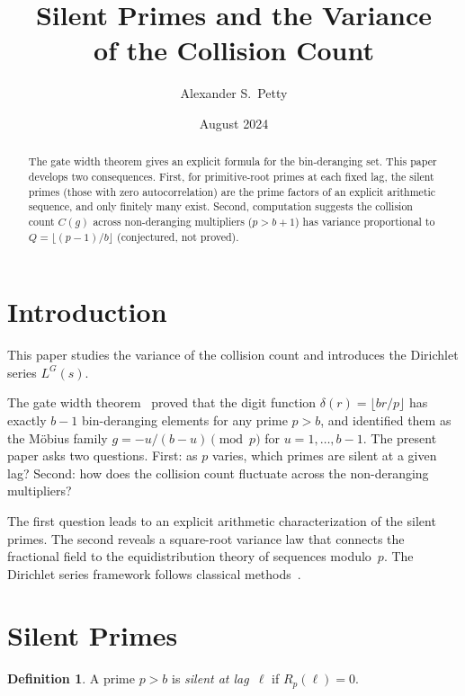 \documentclass[12pt]{amsart}
\title{Silent Primes and the Variance\\of the Collision Count}
\author{Alexander S.\ Petty}
\date{August 2024}
\theoremstyle{definition}
\newtheorem{definition}[theorem]{Definition}
\theoremstyle{remark}
\begin{document}
\begin{abstract}
The gate width theorem gives an explicit formula for the
bin-deranging set. This paper develops two consequences.
First, for primitive-root primes at each fixed lag, the
silent primes (those with zero autocorrelation) are the
prime factors of an explicit arithmetic sequence, and
only finitely many exist. Second, computation suggests
the collision count $C(g)$ across non-deranging
multipliers ($p > b{+}1$) has variance proportional to
$Q = \lfloor (p{-}1)/b \rfloor$ (conjectured, not
proved).
\end{abstract}
\maketitle

\section{Introduction}

This paper studies the variance of the collision count and introduces the Dirichlet series $L^G(s)$.

The gate width theorem~\cite{paper11} proved that the digit
function $\delta(r) = \lfloor br/p \rfloor$ has exactly $b - 1$
bin-deranging elements for any prime $p > b$, and identified them
as the M\"obius family $g = -u/(b{-}u) \pmod{p}$ for
$u = 1, \ldots, b{-}1$. The present paper asks two questions.
First: as $p$ varies, which primes are silent at a given lag?
Second: how does the collision count fluctuate across the
non-deranging multipliers?

The first question leads to an explicit arithmetic
characterization of the silent primes. The second reveals a
square-root variance law that connects the fractional field to
the equidistribution theory of sequences modulo~$p$.  The
Dirichlet series framework follows
classical methods~\cite{davenport,hardy}.

\section{Silent Primes}

\begin{definition}
A prime $p > b$ is \emph{silent at lag~$\ell$} if $R_p(\ell) = 0$.
\end{definition}
\end{document}

